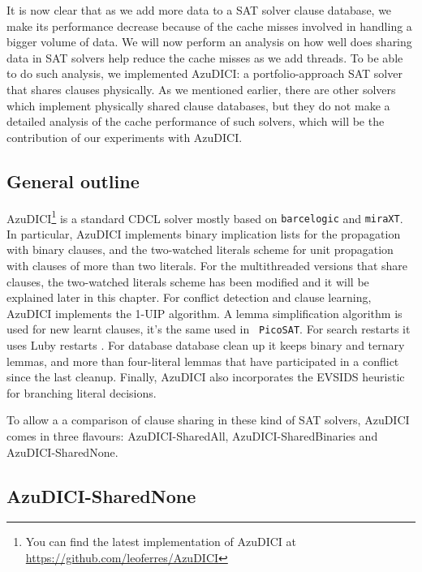\documentclass[12pt]{diicc}
\begin{document}
It is now clear that as we add more data to a SAT solver clause database, we make its performance decrease because of the cache misses involved in handling a bigger volume of data. We will now perform an analysis on how well does sharing data in SAT solvers help reduce the cache misses as we add threads. To be able to do such analysis, we implemented AzuDICI: a portfolio-approach SAT solver that shares clauses physically. As we mentioned earlier, there are other solvers which implement physically shared clause databases, but they do not make a detailed analysis of the cache performance of such solvers, which will be the contribution of our experiments with AzuDICI.

\subsection{General outline}

AzuDICI\footnote{You can find the latest implementation of AzuDICI at
  \url{https://github.com/leoferres/AzuDICI}} is a standard CDCL
solver mostly based on {\tt barcelogic} and {\tt miraXT}. In particular, AzuDICI implements binary implication lists for the
propagation with binary clauses, and the two-watched literals scheme
for unit propagation with clauses of more than two
literals. For the multithreaded versions that share clauses, the two-watched literals scheme has been modified and it will be explained later in this chapter. For conflict detection and clause learning, AzuDICI implements the 1-UIP algorithm. A lemma simplification algorithm is used for new learnt clauses, it's the same used in {\tt
  PicoSAT}. For search restarts it uses Luby restarts \cite{Luby}. For database database clean up it keeps binary and ternary lemmas, and more than four-literal
lemmas that have participated in a conflict since the last
cleanup. Finally, AzuDICI also incorporates the EVSIDS heuristic for
branching literal decisions.

To allow a a comparison of clause sharing in these kind of SAT solvers, AzuDICI comes in three flavours: AzuDICI-SharedAll, AzuDICI-SharedBinaries and AzuDICI-SharedNone.

\subsection{AzuDICI-SharedNone}
\end{document}
